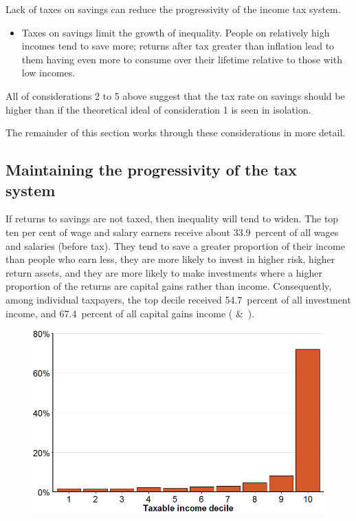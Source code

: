 \documentclass{grattan}\usepackage[]{graphicx}\usepackage[]{color}
\begin{document}
\consideration Lack of taxes on savings can reduce the progressivity of the income tax system.
\begin{itemize}
\item 	Taxes on savings limit the growth of inequality. People on relatively high incomes tend to save more; returns after tax greater than
inflation lead to them having even more to consume over their lifetime relative to those with low incomes.
\end{itemize}
All of considerations 2 to 5 above suggest that the tax rate on savings should be higher than if the theoretical ideal of consideration 1 is seen in isolation.

The remainder of this section works through these considerations in more detail.



\subsection{Maintaining the progressivity of the tax system}\label{sec:maintaining-progressivity-tax-system}


If returns to savings are not taxed, then inequality will tend to widen. The top ten per cent of wage and salary earners receive about 33.9~percent of all wages and salaries (before tax). They tend to save a greater proportion of their income than people who earn less, they are more likely to invest in higher risk, higher return assets, and they are more likely to make investments where a higher proportion of the returns are capital gains rather than income.  Consequently, among individual taxpayers, the top decile received 54.7~percent of all investment income, and 67.4~percent of all capital gains income ( \&\ ). 

\begin{figure}

\includegraphics[width=\columnwidth]{CGT-NG-atlas//CG-by-decile-1}
\end{figure}
\end{document}
